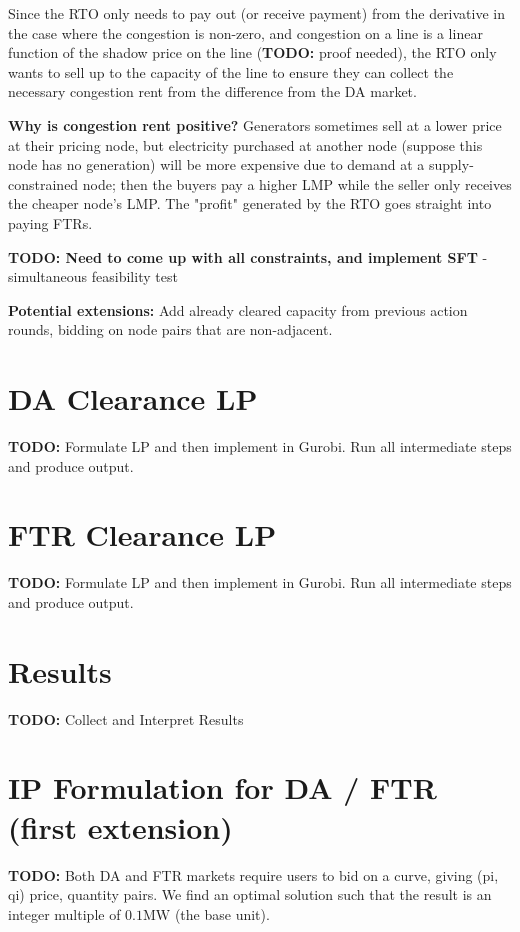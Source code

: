 \documentclass[11pt]{article}
\begin{document}
Since the RTO only needs to pay out (or receive payment) from the derivative in the case where the congestion is non-zero, and congestion on a line is a linear function of the shadow price on the line (\textbf{TODO:} proof needed), the RTO only wants to sell up to the capacity of the line to ensure they can collect the necessary congestion rent from the difference from the DA market.

\textbf{Why is congestion rent positive? } Generators sometimes sell at a lower price at their pricing node, but electricity purchased at another node (suppose this node has no generation) will be more expensive due to demand at a supply-constrained node; then the buyers pay a higher LMP while the seller only receives the cheaper node's LMP. The "profit" generated by the RTO goes straight into paying FTRs.

\textbf{TODO: Need to come up with all constraints, and implement SFT} - simultaneous feasibility test

\textbf{Potential extensions:} Add already cleared capacity from previous action rounds, bidding on node pairs that are non-adjacent.

\section{DA Clearance LP}
\textbf{TODO:} Formulate LP and then implement in Gurobi. Run all intermediate steps and produce output.

\section{FTR Clearance LP}
\textbf{TODO:} Formulate LP and then implement in Gurobi. Run all intermediate steps and produce output.

\section{Results}
\textbf{TODO:} Collect and Interpret Results

\section{IP Formulation for DA / FTR (first extension)}
\textbf{TODO:} Both DA and FTR markets require users to bid on a curve, giving (pi, qi) price, quantity pairs. We find an optimal solution such that the result is an integer multiple of $0.1\text{MW}$ (the base unit).
\end{document}
